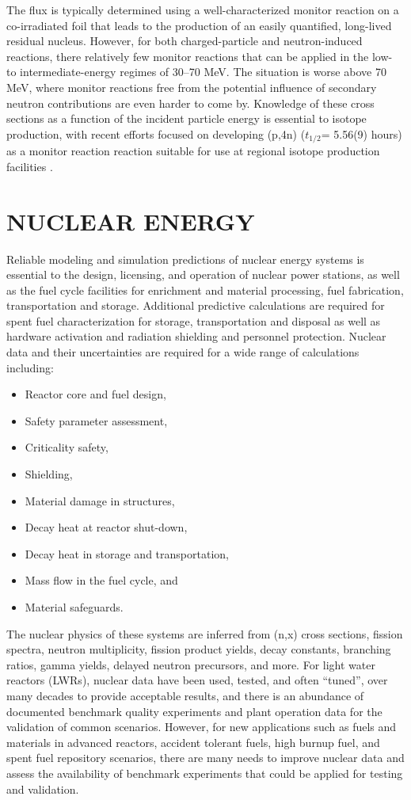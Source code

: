 \documentclass[letterpaper]{ar-1col}
\begin{document}
The flux is typically determined using a well-characterized monitor reaction on a co-irradiated foil that leads to the production of an easily quantified, long-lived residual nucleus. However, for both charged-particle and neutron-induced reactions, there relatively few monitor reactions that can be applied in the low- to intermediate-energy regimes of 30--70 MeV.  The situation is worse above 70 MeV, where monitor reactions  free from the potential influence of secondary neutron contributions are even harder to come by.  Knowledge of these cross sections as a function of the incident particle energy is essential to  isotope production, with recent efforts focused on developing  (p,4n) ($t_{1/2}$= 5.56(9) hours) as a monitor reaction reaction suitable for use at regional isotope production facilities \cite{Voyles2018a, Kim2018}.  


\section{NUCLEAR ENERGY}

Reliable modeling and simulation predictions of nuclear energy systems is essential to the design, licensing, and operation of nuclear power stations, as well as the fuel cycle facilities for enrichment and material processing, fuel fabrication, transportation and storage. Additional predictive calculations are required for spent fuel characterization for storage, transportation and disposal as well as hardware activation and radiation shielding and personnel protection. Nuclear data and their uncertainties are required for a wide range of calculations including:
\begin{itemize}
  \item Reactor core and fuel design,
  \item Safety parameter assessment,
  \item Criticality safety,
  \item Shielding,
  \item Material damage in structures,
  \item Decay heat at reactor shut-down,
  \item Decay heat in storage and transportation,
  \item Mass flow in the fuel cycle, and
  \item Material safeguards.
\end{itemize}

The nuclear physics of these systems are inferred from (n,x) cross sections, fission spectra, neutron multiplicity, fission product yields, decay constants, branching ratios, gamma yields, delayed neutron precursors, and more.  For light water reactors (LWRs), nuclear data have been used, tested, and often \enquote{tuned}, over many decades to provide acceptable results, and there is an abundance of documented benchmark quality experiments and plant operation data for the validation of common scenarios. However, for new applications such as fuels and materials in advanced reactors, accident tolerant fuels, high burnup fuel, and spent fuel repository scenarios, there are many needs to improve nuclear data and assess the availability of benchmark experiments that could be applied for testing and validation. 
\end{document}
